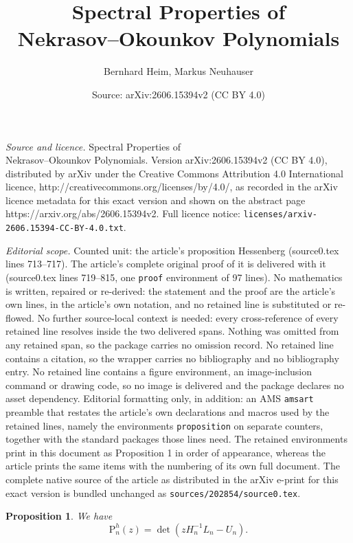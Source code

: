 \documentclass[10pt,a4paper]{amsart}
\title{Spectral Properties of\\ Nekrasov--Okounkov Polynomials}
\author{Bernhard Heim, Markus Neuhauser}
\date{Source: arXiv:2606.15394v2 (CC BY 4.0)}
\newtheorem{proposition}{Proposition}
\newcommand{\pol}{\mathrm{P}}
\begin{document}
\maketitle

\noindent\emph{Source and licence.} Spectral Properties of\\ Nekrasov--Okounkov Polynomials. Version arXiv:2606.15394v2 (CC BY 4.0), distributed by arXiv under the Creative Commons Attribution 4.0 International licence, http://creativecommons.org/licenses/by/4.0/, as recorded in the arXiv licence metadata for this exact version and shown on the abstract page https://arxiv.org/abs/2606.15394v2. Full licence notice: \texttt{licenses/arxiv-2606.15394-CC-BY-4.0.txt}.\par\smallskip

\noindent\textit{Editorial scope.} Counted unit: the article's proposition Hessenberg (source0.tex lines 713--717). The article's complete original proof of it is delivered with it (source0.tex lines 719--815, one \texttt{proof} environment of 97 lines). No mathematics is written, repaired or re-derived: the statement and the proof are the article's own lines, in the article's own notation, and no retained line is substituted or re-flowed.  No further source-local context is needed: every cross-reference of every retained line resolves inside the two delivered spans.  Nothing was omitted from any retained span, so the package carries no omission record.  No retained line contains a citation, so the wrapper carries no bibliography and no bibliography entry.  No retained line contains a figure environment, an image-inclusion command or drawing code, so no image is delivered and the package declares no asset dependency.  Editorial formatting only, in addition: an AMS \texttt{amsart} preamble that restates the article's own declarations and macros used by the retained lines, namely the environments \texttt{proposition} on separate counters, together with the standard packages those lines need.  The retained environments print in this document as Proposition 1 in order of appearance, whereas the article prints the same items with the numbering of its own full document.  The complete native source of the article as distributed in the arXiv e-print for this exact version is bundled unchanged as \texttt{sources/202854/source0.tex}.
\begin{proposition} We have
\begin{equation*} \label{Hessenberg}
\pol _n^{h}(z) =\det \left( z H_n^{-1} L_n - U_n \right).
\end{equation*}
\end{proposition}
\end{document}
